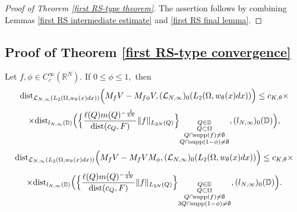 \documentclass{amsart}
\begin{document}
\begin{proof}[Proof of Theorem \ref{first RS-type theorem}] The assertion follows by combining Lemmas \ref{first RS intermediate estimate} and \ref{first RS final lemma}.
\end{proof}

\subsection{Proof of Theorem \ref{first RS-type convergence}}

\begin{lemma}\label{first RS convergence lemma} Let $f,\phi\in C^{\infty}_c(\mathbb{R}^N).$ If $0\leq\phi\leq1,$ then
$${\rm dist}_{\mathcal{L}_{N,\infty}(L_2(\Omega,w_{\theta}(x)dx))}\Big(M_fV-M_{f\phi}V,(\mathcal{L}_{N,\infty})_0(L_2(\Omega,w_{\theta}(x)dx))\Big)\leq c_{K,\theta}\times$$
$$\times{\rm dist}_{l_{N,\infty}(\mathbb{D})}\Big(\Big\{\frac{\ell(Q)m(Q)^{-\frac1{2N}}}{{\rm dist}(c_Q,F)}\|f\|_{L_{2N}(Q)}\Big\}_{\substack{Q\in\mathbb{D}\\ Q\subset\Omega\\ Q\cap {\rm supp}(f)\neq\emptyset\\ Q\cap {\rm supp}(1-\phi)\neq\emptyset}},(l_{N,\infty})_0(\mathbb{D})\Big),$$
$${\rm dist}_{\mathcal{L}_{N,\infty}(L_2(\Omega,w_{\theta}(x)dx))}\Big(M_fV-M_fVM_{\phi},(\mathcal{L}_{N,\infty})_0(L_2(\Omega,w_{\theta}(x)dx))\Big)\leq c_{K,\theta}\times$$
$$\times{\rm dist}_{l_{N,\infty}(\mathbb{D})}\Big(\Big\{\frac{\ell(Q)m(Q)^{-\frac1{2N}}}{{\rm dist}(c_Q,F)}\|f\|_{L_{2N}(Q)}\Big\}_{\substack{Q\in\mathbb{D}\\ Q\subset\Omega\\ Q\cap {\rm supp}(f)\neq\emptyset\\ 3Q\cap {\rm supp}(1-\phi)\neq\emptyset}},(l_{N,\infty})_0(\mathbb{D})\Big).$$
\end{lemma}
\end{document}
